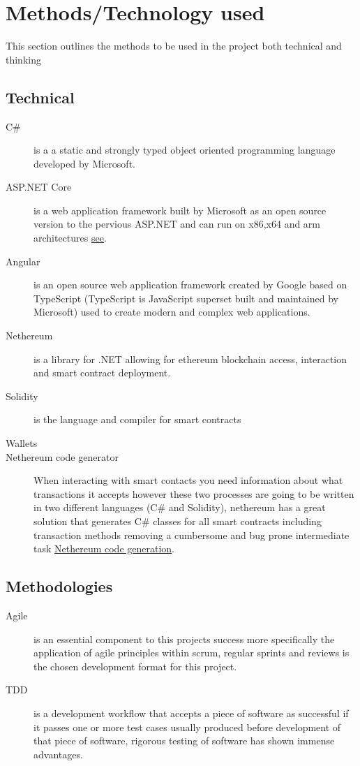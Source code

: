 \documentclass[12pt]{report}
\begin{document}
\chapter{Methods/Technology used}

This section outlines the methods to be used in the project both technical and thinking

\section{Technical}

\begin{description}
	\item[C\#] is a a static and strongly typed object oriented programming language developed by Microsoft.
	\item[ASP.NET Core] is a web application framework built by Microsoft as an open source version to the pervious ASP.NET and can run on x86,x64 and arm architectures \href{https://docs.microsoft.com/en-us/aspnet/core/introduction-to-aspnet-core}{see}.
	\item[Angular] is an open source web application framework created by Google based on TypeScript (TypeScript is JavaScript superset built and maintained by Microsoft) used to create modern and complex web applications.
	\item[Nethereum] is a library for .NET allowing for ethereum blockchain access, interaction and smart contract deployment.
	\item[Solidity] is the language and compiler for smart contracts
	\item[Wallets] %
	\item[Nethereum code generator] When interacting with smart contacts you need information about what transactions it accepts however these two processes are going to be written in two different languages (C\# and Solidity), nethereum has a great solution that generates C\# classes for all smart contracts including transaction methods removing a cumbersome and bug prone intermediate task \href{https://docs.nethereum.com/en/latest/nethereum-code-generation/}{Nethereum code generation}.
\end{description}

\section{Methodologies}

\begin{description}
	\item[Agile] is an essential component to this projects success more specifically the application of agile principles within scrum, regular sprints and reviews is the chosen development format for this project.
	\item[TDD] is a development workflow that accepts a piece of software as successful if it passes one or more test cases usually produced before development of that piece of software, rigorous testing of software has shown immense advantages.
\end{description}
\end{document}
